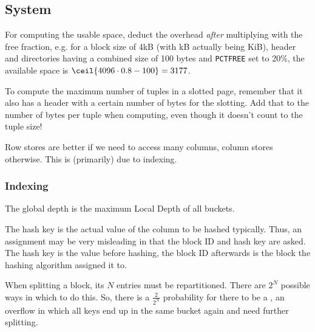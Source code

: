 \subsection{System}
For computing the usable space, deduct the overhead \textit{after} multiplying with the free fraction,
e.g. for a block size of 4kB (with kB actually being KiB), header and directories having a combined size of 100 bytes and \texttt{PCTFREE} set to 20\%,
the available space is $\ceil{4096 \cdot 0.8 - 100} = 3177$.

To compute the maximum number of tuples in a slotted page, remember that it also has a header with a certain number of bytes for the slotting.
Add that to the number of bytes per tuple when computing, even though it doesn't count to the tuple size!

Row stores are better if we need to access many columns, column stores otherwise. This is (primarily) due to indexing.


\subsubsection{Indexing}
The global depth is the maximum Local Depth of all buckets.

The hash key is the actual value of the column to be hashed typically.
Thus, an assignment may be very misleading in that the block ID and hash key are asked.
The hash key is the value before hashing, the block ID afterwards is the block the hashing algorithm assigned it to.

When splitting a block, its $N$ entries must be repartitioned. There are $2^N$ possible ways in which to do this.
So, there is a $\frac{2}{2^N}$ probability for there to be a , an overflow in which all keys end up in the same bucket again
and need further splitting.
